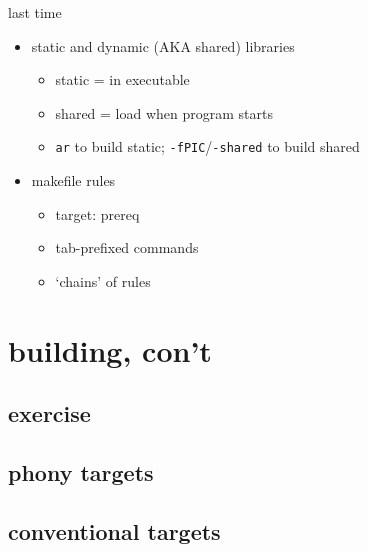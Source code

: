 \date{}
\title{}
\date{}

\begin{frame}
    \titlepage
\end{frame}



\begin{frame}{last time}
    \begin{itemize}
        \item static and dynamic (AKA shared) libraries
            \begin{itemize}
            \item static = in executable
            \item shared = load when program starts
            \item \texttt{ar} to build static; \texttt{-fPIC}/\texttt{-shared} to build shared
            \end{itemize}
        \item makefile rules
            \begin{itemize}
            \item target: prereq
            \item tab-prefixed commands
            \item `chains' of rules
            \end{itemize}
    \end{itemize}
\end{frame}

\section{building, con't}

\subsection{exercise}


\subsection{phony targets}



\subsection{conventional targets}



